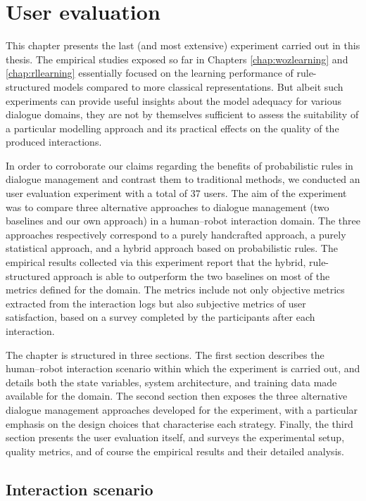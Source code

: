 \chapter{User evaluation}
\label{chap:user-evaluation}

This chapter presents the last (and most extensive) experiment carried out in this thesis. The empirical studies exposed so far in Chapters \ref{chap:wozlearning} and \ref{chap:rllearning} essentially focused on the learning performance of rule-structured models compared to more classical representations. But albeit such experiments can provide useful insights about the model adequacy for various dialogue domains, they are not by themselves sufficient to assess the suitability of a particular modelling approach and its practical effects on the quality of the produced interactions. 

In order to corroborate our claims regarding the benefits of probabilistic rules in dialogue management and contrast them to traditional methods, we conducted an user evaluation experiment with a total of 37 users. The aim of the experiment was to compare three alternative approaches to dialogue management (two baselines and our own approach) in a human--robot interaction domain.  The three approaches respectively correspond to a purely handcrafted approach, a purely statistical approach, and a hybrid approach based on probabilistic rules. The empirical results collected via this experiment report that the  hybrid, rule-structured approach is able to outperform the two baselines on most of the metrics defined for the domain.  The metrics include not only objective metrics extracted from the interaction logs but also subjective metrics of user satisfaction, based on a survey completed by the participants after each interaction. 


The chapter is structured in three sections.  The first section describes the human--robot interaction scenario within which the experiment is carried out, and details both the state variables, system architecture, and training data made available for the domain. The second section then exposes the three alternative dialogue management approaches developed for the experiment, with a particular emphasis on the design choices that characterise each strategy.   Finally, the third section presents the user evaluation itself, and surveys the experimental setup, quality metrics, and of course the empirical results and their detailed analysis. 

\section{Interaction scenario}

